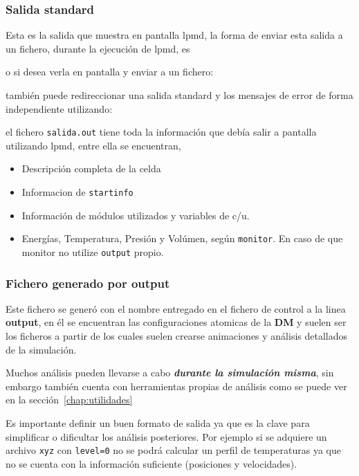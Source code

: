 \subsubsection{Salida standard}
Esta es la salida que muestra en pantalla lpmd, la forma de enviar esta salida a un fichero, durante la ejecuci\'on de lpmd, es


o si desea verla en pantalla y enviar a un fichero:


tambi\'en puede redireccionar una salida standard y los mensajes de error de forma independiente utilizando:


el fichero \verb|salida.out| tiene toda la informaci\'on que deb\'ia salir a pantalla utilizando lpmd, entre ella se encuentran,

\begin{itemize}
 \item Descripci\'on completa de la celda
 \item Informacion de \verb|startinfo|
 \item Informaci\'on de m\'odulos utilizados y variables de c/u.
 \item Energ\'ias, Temperatura, Presi\'on y Vol\'umen, seg\'un \verb|monitor|. En caso de que monitor no utilize \verb|output| propio.
\end{itemize}


\subsubsection{Fichero generado por output}
Este fichero se gener\'o con el nombre entregado en el fichero de control a la linea \textbf{output}, en \'el se encuentran las configuraciones atomicas de la \textbf{DM} y suelen ser los ficheros a partir de los cuales suelen crearse animaciones y an\'alisis detallados de la simulaci\'on.

Muchos an\'alisis pueden llevarse a cabo \textit{\textbf{durante la simulaci\'on misma}}, sin embargo \lpmd tambi\'en cuenta con herramientas propias de an\'alisis como se puede ver en la secci\'on~\ref{chap:utilidades}

Es importante definir un buen formato de salida ya que es la clave para simplificar o dificultar los an\'alisis posteriores. Por ejemplo si se adquiere un archivo \verb|xyz| con \verb|level=0| no se podr\'a calcular un perfil de temperaturas ya que no se cuenta con la informaci\'on suficiente (posiciones y velocidades).


